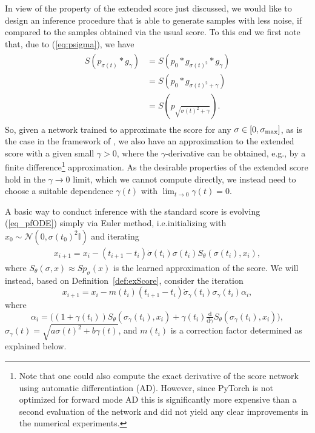 \documentclass{article}
\theoremstyle{plain}
\theoremstyle{definition}
\theoremstyle{remark}
\newcommand{\cN}{\mathcal{N}}
\renewcommand{\d}{\mathrm{d}}
\newcommand{\ddgamma}{\tfrac{\d}{\d\gamma}}
\begin{document}
In view of the property of the extended score just discussed, we would like to design an inference procedure that is able to generate samples with less noise, if compared to the samples obtained via the usual score. 
To this end we first note that, due to (\ref{eq:psigma}), we have
\begin{align}\begin{split}\label{eq:VE_trick}
S(p_{\sigma(t)}*g_\gamma)&=S(p_0*g_{\sigma(t)^2}*g_\gamma)\\
&=S(p_0*g_{\sigma(t)^2+\gamma})\\&=S(p_{\sqrt{\sigma(t)^2+\gamma}}).
\end{split}\end{align}
So, given a network trained to approximate the score for any $\sigma\in[0,\sigma_{\rm max}]$, as is the case in the framework of \cite{edm}, we also have an approximation to the extended score with a given small $\gamma>0$, where the $\gamma$-derivative can be obtained, e.g.\@, by a finite difference\footnote{Note that one could also compute the exact derivative of the score network using automatic differentiation (AD). However, since PyTorch is not optimized for forward mode AD this is significantly more expensive than a second evaluation of the network and did not yield any clear improvements in the numerical experiments.} approximation. As the desirable properties of the extended score hold in the $\gamma\to 0$ limit, which we cannot compute directly, we instead need to choose a suitable dependence $\gamma(t)$ with $\lim_{t\to 0}\gamma(t)=0$.

 A basic way to conduct inference with the standard score is evolving (\ref{eq_pfODE})
 simply via Euler method, i.e.\@ initializing with $x_0\sim\cN(0,\sigma(t_0)^2\mathbb{I})$ and iterating
\begin{align}\label{eq:basic_Euler}
    x_{i+1} = x_{i}- (t_{i+1}-t_i)\dot{\sigma}(t_i)\sigma(t_i) S_\theta(\sigma(t_i),x_i),
\end{align}
where $S_\theta(\sigma,x)\approx Sp_\sigma(x)$ is the learned approximation of the score. We will instead, based on Definition~\ref{def:exScore}, consider the iteration 
\small
\begin{equation}\label{eq:modified_inference}
    x_{i+1} = x_{i}- m(t_i)(t_{i+1}-t_i)\dot{\sigma}_\gamma(t_i)\sigma_\gamma(t_i) \alpha_i, 
\end{equation}
\normalsize
where
\[
\alpha_i=\big((1+\gamma(t_i))S_\theta(\sigma_\gamma(t_i),x_i) +\gamma(t_i)\ddgamma S_\theta(\sigma_\gamma(t_i),x_i)\big),\]
$\sigma_\gamma(t)=\sqrt{a\sigma(t)^2+b\gamma(t)}$, and $m(t_i)$ is a correction factor determined as explained below.
\end{document}
